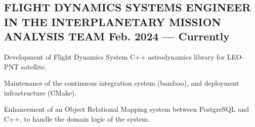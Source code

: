 \documentclass[letter,10pt]{article}
\begin{document}
\subsection{{FLIGHT DYNAMICS SYSTEMS ENGINEER IN THE INTERPLANETARY MISSION ANALYSIS TEAM \hfill Feb. 2024  --- Currently}}
\item Development of Flight Dynamics System C++ astrodynamics library for LEO-PNT satellite. 
\item Maintenance of the continuous integration system (bamboo), and deployment infrastructure (CMake).
\item Enhancement of an Object Relational Mapping system between PostgreSQL and C++, to handle the domain logic of the system.
\end{document}
